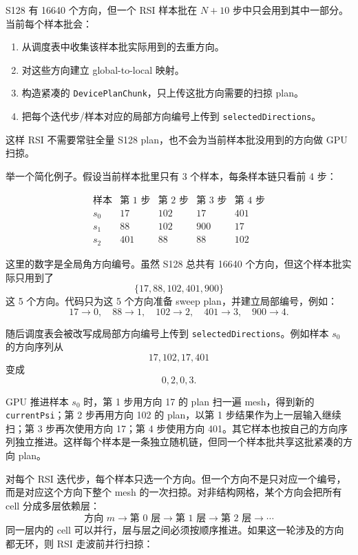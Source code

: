\documentclass[10pt]{article}
\newcommand{\subsect}[1]{\vspace{2mm}{\sffamily\large\bfseries #1}\par}
\newcommand{\code}[1]{\texttt{#1}}
\begin{document}
\subsect{4.2 每批只构造实际需要的方向 plan}

S128 有 16640 个方向，但一个 RSI 样本批在 $N+10$ 步中只会用到其中一部分。当前每个样本批会：

\begin{enumerate}
\item 从调度表中收集该样本批实际用到的去重方向。
\item 对这些方向建立 global-to-local 映射。
\item 构造紧凑的 \code{DevicePlanChunk}，只上传这批方向需要的扫掠 plan。
\item 把每个迭代步/样本对应的局部方向编号上传到 \code{selectedDirections}。
\end{enumerate}

这样 RSI 不需要常驻全量 S128 plan，也不会为当前样本批没用到的方向做 GPU 扫掠。

举一个简化例子。假设当前样本批里只有 3 个样本，每条样本链只看前 4 步：

\[
\begin{array}{c|cccc}
\text{样本} & \text{第 1 步} & \text{第 2 步} & \text{第 3 步} & \text{第 4 步}\\
\hline
s_0 & 17 & 102 & 17 & 401\\
s_1 & 88 & 102 & 900 & 17\\
s_2 & 401 & 88 & 88 & 102
\end{array}
\]

这里的数字是全局角方向编号。虽然 S128 总共有 16640 个方向，但这个样本批实际只用到了
\[
\{17,88,102,401,900\}
\]
这 5 个方向。代码只为这 5 个方向准备 sweep plan，并建立局部编号，例如：
\[
17\rightarrow 0,\quad 88\rightarrow 1,\quad 102\rightarrow 2,\quad 401\rightarrow 3,\quad 900\rightarrow 4.
\]

随后调度表会被改写成局部方向编号上传到 \code{selectedDirections}。例如样本 $s_0$ 的方向序列从
\[
17,102,17,401
\]
变成
\[
0,2,0,3.
\]

GPU 推进样本 $s_0$ 时，第 1 步用方向 17 的 plan 扫一遍 mesh，得到新的 \code{currentPsi}；第 2 步再用方向 102 的 plan，以第 1 步结果作为上一层输入继续扫；第 3 步再次使用方向 17；第 4 步使用方向 401。其它样本也按自己的方向序列独立推进。这样每个样本是一条独立随机链，但同一个样本批共享这批紧凑的方向 plan。

\subsect{4.3 RSI 波前并行扫掠}

对每个 RSI 迭代步，每个样本只选一个方向。但一个方向不是只对应一个编号，而是对应这个方向下整个 mesh 的一次扫掠。对非结构网格，某个方向会把所有 cell 分成多层依赖层：
\[
\text{方向 }m \rightarrow \text{第 0 层} \rightarrow \text{第 1 层} \rightarrow \text{第 2 层} \rightarrow \cdots
\]
同一层内的 cell 可以并行，层与层之间必须按顺序推进。如果这一轮涉及的方向都无环，则 RSI 走波前并行扫掠：
\end{document}
